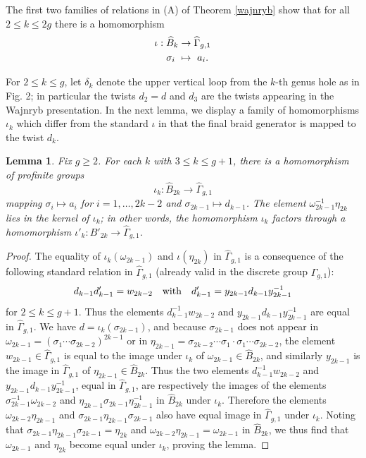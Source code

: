 \documentclass[a4paper,10pt,reqno]{amsart}
\newcommand\B{\widehat{B}}
\newcommand\GGone{\widehat{\Gamma}_{g,1}}
\newtheorem{lem}[thm]{Lemma}
\begin{document}
\vspace{.2cm}
The first two families of relations in (A) of Theorem \ref{wajnryb} show that
for all $2\le k\le 2g$ there is a homomorphism
\begin{align}\label{iota}
\iota:\B_k&\rightarrow \GGone\\
\sigma_i\ &\mapsto \ a_i.\notag
\end{align}

For $2\le k\le g$, let $\delta_k$ denote
the upper vertical loop from the $k$-th genus hole as in Fig. 2; 
in particular the twists $d_2=d$ and $d_3$ 
are the twists appearing in the Wajnryb presentation. In the next lemma,
we display a family of homomorphisms $\iota_k$ which differ from the
standard $\iota$ in that the final braid generator is mapped to the twist $d_k$.

\begin{lem}\label{iotas} Fix $g\ge 2$.  For each 
$k$ with $3\le k\le g+1$, there is a homomorphism of profinite groups 
\begin{equation}\label{iotak}
\iota_k:\B_{2k}\rightarrow \widehat\Gamma_{g,1}
\end{equation}
mapping $\sigma_i\mapsto a_i$ 
for $i=1,\ldots,2k-2$ and $\sigma_{2k-1}\mapsto d_{k-1}$.
The element $\omega_{2k-1}^{-1}\eta_{2k}$ lies in the kernel of $\iota_k$; 
in other words, the homomorphism $\iota_k$ factors through a homomorphism
$\iota'_k:\B'_{2k}\rightarrow \widehat\Gamma_{g,1}$. 
\end{lem}

\begin{proof}

The equality of $\iota_k(\omega_{2k-1})$ and
$\iota(\eta_{2k})$ in $\widehat\Gamma_{g,1}$ is a consequence of the following
standard relation in $\widehat\Gamma_{g,1}$ (already valid in
the discrete group $\Gamma_{g,1}$):
$$d_{k-1}d'_{k-1}=w_{2k-2} \ \ \ {\rm with}\ \ \ 
d'_{k-1}=y_{2k-1}d_{k-1}y_{2k-1}^{-1}$$
for $2\le k\le g+1$. Thus the elements
$d_{k-1}^{-1}w_{2k-2}$ and $y_{2k-1}d_{k-1}y_{2k-1}^{-1}$ are equal in $\GGone$.
We have $d=\iota_k(\sigma_{2k-1})$, and because $\sigma_{2k-1}$ does not
appear in $\omega_{2k-1}=(\sigma_1\cdots \sigma_{2k-2})^{2k-1}$ or in
$\eta_{2k-1}=\sigma_{2k-2}\cdots \sigma_1\cdot \sigma_1\cdots \sigma_{2k-2}$,
the element $w_{2k-1}\in \GGone$ is equal to the image under $\iota_k$ of
$\omega_{2k-1}\in \B_{2k}$, and similarly $y_{2k-1}$ is the image in $\GGone$
of $\eta_{2k-1}\in \B_{2k}$. Thus the two elements $d_{k-1}^{-1}w_{2k-2}$ and
$y_{2k-1}d_{k-1}y_{2k-1}^{-1}$, equal in $\GGone$,  are respectively the images 
of the elements $\sigma_{2k-1}^{-1}\omega_{2k-2}$ and $\eta_{2k-1}\sigma_{2k-1} 
\eta_{2k-1}^{-1}$ in $\B_{2k}$ under $\iota_k$. Therefore the elements
$\omega_{2k-2}\eta_{2k-1}$ and $\sigma_{2k-1}\eta_{2k-1}\sigma_{2k-1}$ also have
equal image in $\GGone$ under $\iota_k$. Noting that 
$\sigma_{2k-1}\eta_{2k-1}\sigma_{2k-1}=\eta_{2k}$ and
$\omega_{2k-2}\eta_{2k-1}=\omega_{2k-1}$ in $\B_{2k}$, we thus find that
$\omega_{2k-1}$ and $\eta_{2k}$ become equal under $\iota_k$, proving the 
lemma.
\end{proof}
\end{document}
